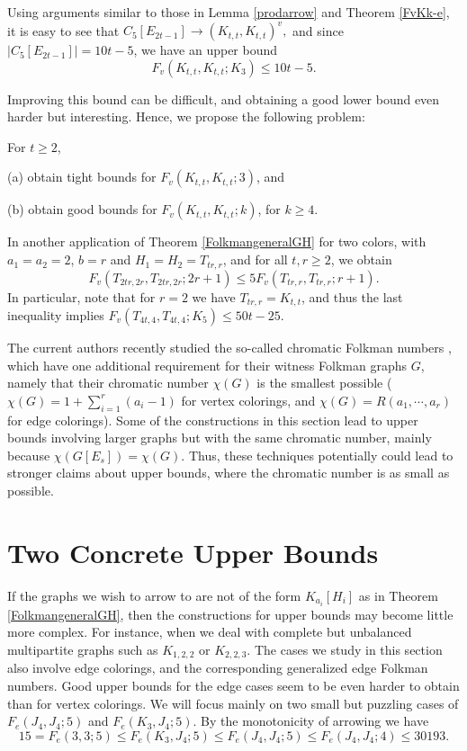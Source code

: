 \medskip
Using arguments similar to those in
Lemma \ref{prodarrow} and Theorem \ref{FvKk-e},
it is easy to see that
$C_5 [E_{2t-1}] \rightarrow (K_{t,t}, K_{t,t})^v,$
and since $|C_5 [E_{2t-1}]| = 10t-5$, we have an
upper bound
$$F_v (K_{t,t}, K_{t,t}; K_3) \leq 10t -5.$$

\noindent
Improving this bound can be difficult, and
obtaining a good lower bound even harder but
interesting. Hence, we propose the following
problem:

\begin{Prob} \label{F_vK_{t,t}}
For $t \ge 2$,

\smallskip
\noindent
{\rm (a)}
obtain tight bounds for $F_v (K_{t,t}, K_{t,t};3)$, and

\noindent
{\rm (b)}
obtain good bounds for $F_v (K_{t,t}, K_{t,t};k)$, for $k \ge 4$.
\end{Prob}

\medskip
In another application of Theorem \ref{FolkmangeneralGH}
for two colors, with $a_1=a_2=2$, $b=r$ and
$H_1=H_2=T_{tr,r}$,
and for all $t,r \ge 2$, we obtain 
$$F_v(T_{2tr,2r},T_{2tr,2r};2r+1) \leq
5 F_v(T_{tr,r},T_{tr,r}; r+1).$$
In particular,
note that for $r=2$ we have $T_{tr,r}=K_{t,t}$, and
thus the last inequality implies
$F_v(T_{4t,4},T_{4t,4}; K_5) \leq 50t -25.$

\bigskip
The current authors recently studied
the so-called chromatic Folkman numbers \cite{XLR0}, which have
one additional requirement for their witness Folkman
graphs $G$, namely that their chromatic number
$\chi(G)$ is the smallest possible
($\chi(G)=1+ \sum_{i=1}^r (a_i - 1)$
for vertex colorings, and
$\chi(G)=R(a_1, \cdots, a_r)$ for edge colorings).
Some of the constructions in this section lead to
upper bounds involving larger graphs but with
the same chromatic number, mainly because
$\chi(G[E_s]) = \chi(G)$. Thus, these techniques
potentially could lead to stronger claims about upper bounds,
where the chromatic number is as small as possible.

\bigskip
\section{Two Concrete Upper Bounds}

\medskip
If the graphs we wish to arrow to are not of the form
$K_{a_i}[H_i]$ as in Theorem \ref{FolkmangeneralGH},
then the constructions for upper bounds may become
little more complex. For instance, when we deal with
complete but unbalanced multipartite graphs such as
$K_{1,2,2}$ or $K_{2,2,3}$. The cases we study in this section
also involve edge colorings, and the corresponding
generalized edge Folkman numbers. Good upper bounds
for the edge cases seem to be even harder to obtain
than for vertex colorings.
We will focus mainly on two small but puzzling cases
of $F_e(J_4,J_4;5)$ and $F_e(K_3,J_4;5)$.
By the monotonicity of arrowing we have
$$15 = F_e(3,3;5) \le F_e(K_3,J_4;5)
\le F_e(J_4,J_4;5) \le F_e(J_4,J_4;4) \le 30193.$$

